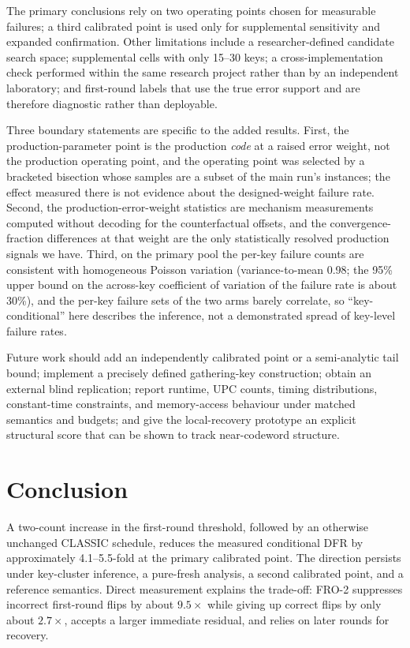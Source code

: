 \documentclass[lettersize,journal]{IEEEtran}
\begin{document}
The primary conclusions rely on two operating points chosen for measurable failures; a third calibrated point is used only for supplemental sensitivity and expanded confirmation. Other limitations include a researcher-defined candidate search space; supplemental cells with only 15--30 keys; a cross-implementation check performed within the same research project rather than by an independent laboratory; and first-round labels that use the true error support and are therefore diagnostic rather than deployable.

Three boundary statements are specific to the added results. First, the production-parameter point is the production \emph{code} at a raised error weight, not the production operating point, and the operating point was selected by a bracketed bisection whose samples are a subset of the main run's instances; the effect measured there is not evidence about the designed-weight failure rate. Second, the production-error-weight statistics are mechanism measurements computed without decoding for the counterfactual offsets, and the convergence-fraction differences at that weight are the only statistically resolved production signals we have. Third, on the primary pool the per-key failure counts are consistent with homogeneous Poisson variation (variance-to-mean 0.98; the 95\% upper bound on the across-key coefficient of variation of the failure rate is about 30\%), and the per-key failure sets of the two arms barely correlate, so ``key-conditional'' here describes the inference, not a demonstrated spread of key-level failure rates.

Future work should add an independently calibrated point or a semi-analytic tail bound; implement a precisely defined gathering-key construction; obtain an external blind replication; report runtime, UPC counts, timing distributions, constant-time constraints, and memory-access behaviour under matched semantics and budgets; and give the local-recovery prototype an explicit structural score that can be shown to track near-codeword structure.

\section{Conclusion}\label{sec:conclusion}

A two-count increase in the first-round threshold, followed by an otherwise unchanged CLASSIC schedule, reduces the measured conditional DFR by approximately 4.1--5.5-fold at the primary calibrated point. The direction persists under key-cluster inference, a pure-fresh analysis, a second calibrated point, and a reference semantics. Direct measurement explains the trade-off: FRO-2 suppresses incorrect first-round flips by about $9.5\times$ while giving up correct flips by only about $2.7\times$, accepts a larger immediate residual, and relies on later rounds for recovery.
\end{document}
